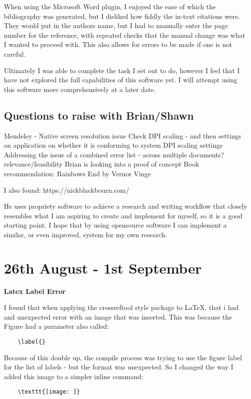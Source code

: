 \documentclass{article}
\begin{document}
When using the Microsoft Word plugin, I enjoyed the ease of which the bibliography was generated, but I disliked how fiddly the in-text citations were. They would put in the authors name, but I had to manually enter the page number for the reference, with repeated checks that the manual change was what I wanted to proceed with. This also allows for errors to be made if one is not careful. 

Ultimately I was able to complete the task I set out to do, however I feel that I have not explored the full capabilities of this software yet. 
I will attempt using this software more comprehensively at a later date.

\subsection{Questions to raise with Brian/Shawn}
\begin{outline}[enumerate]
    \1 Mendeley - Native screen resolution issue
        \2 Check DPI scaling - and then settings on application on whether it is conforming to system DPI scaling settings
    \1 Addressing the issue of a combined error list - across multiple documents? relevance/feasibility 
        \2 Brian is looking into a proof of concept
    \1 Book recommendation: Rainbows End by Vernor Vinge
\end{outline}

I also found: https://nickblackbourn.com/

He uses propriety software to achieve a research and writing workflow that closely resembles what I am aspiring to create and implement for myself, so it is a good starting point. I hope that by using opensource software I can implement a similar, or even improved, system for my own research.

\section{26th August - 1st September}

\label{Error: LaTeX Label Error}
\textbf{Latex Label Error}

I found that when applying the crossreftool style package to LaTeX, that i had and unexpected error with an image that was inserted. This was because the Figure had a parameter also called:
\begin{verbatim}
    \label{}
\end{verbatim}

Because of this double up, the compile process was trying to use the figure label for the list of labels - but the format was unexpected. So I changed the way I added this image to a simpler inline command:
\begin{verbatim}
    \texttt{[image: ]}
\end{verbatim}
\end{document}
